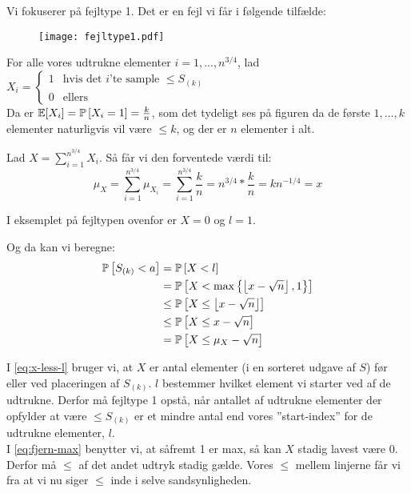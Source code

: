 Vi fokuserer på fejltype 1. Det er en fejl vi får i følgende tilfælde:
\begin{figure}[H]
  \begin{center}
  \texttt{[image: fejltype1.pdf]}
  \end{center}
  \label{fig:fejltype1}
\end{figure}




For alle vores udtrukne elementer $i = 1, ..., n^{3/4}$, lad
$
X_i =
\begin{cases}
	1 & \text{hvis det $i$'te sample $\leq S_{(k)}$}\\
	0 & \text{ellers}
\end{cases}
$\\

Da er ${\mathbb E}[X_i] = \mathbb{P} \left[  X_i = 1  \right] = \frac{k}{n}$, som det tydeligt ses på figuren da de første $1, ..., k$ elementer naturligvis vil være $\leq k$, og der er $n$ elementer i alt.

Lad $X = \sum_{i=1}^{n^{3/4}} X_i$. Så får vi den forventede værdi til:
$$
\mu_X = \sum_{i=1}^{n^{3/4}} \mu_{X_i} = \sum_{i=1}^{n^{3/4}} \frac{k}{n} = n^{3/4} * \frac{k}{n} = kn^{-1/4} = x
$$

I eksemplet på fejltypen ovenfor er $X = 0$ og $l = 1$.

Og da kan vi beregne:
\begin{align}
  \mathbb{P} \left[  S_{(k)} < a  \right] &= \mathbb{P} \left[  X < l  \right] \label{eq:x-less-l}  \\
  &= \mathbb{P} \left[  X < \max \left\{ \left\lfloor x - \sqrt{n} \right\rfloor, 1 \right\}   \right] \nonumber\\
  &\leq \mathbb{P} \left[  X \leq \left\lfloor x - \sqrt{n} \right\rfloor  \right] \label{eq:fjern-max} \\
  &\leq \mathbb{P} \left[  X \leq x - \sqrt{n}  \right] \nonumber\\
  &= \mathbb{P} \left[  X \leq \mu_X - \sqrt{n}  \right] \label{eq:p-simpel}
\end{align}

I \cref{eq:x-less-l} bruger vi, at $X$ er antal elementer (i en sorteret udgave af $S$) før eller ved placeringen af $S_{(k)}$. $l$ bestemmer hvilket element vi starter ved af de udtrukne. Derfor må fejltype 1 opstå, når antallet af udtrukne elementer der opfylder at være $\leq S_{(k)}$ er et mindre antal end vores ''start-index'' for de udtrukne elementer, $l$.\\
I \cref{eq:fjern-max} benytter vi, at såfremt 1 er max, så kan $X$ stadig lavest være 0. Derfor må $\leq$ af det andet udtryk stadig gælde. Vores $\leq$ mellem linjerne får vi fra at vi nu siger $\leq$ inde i selve sandsynligheden.\\

